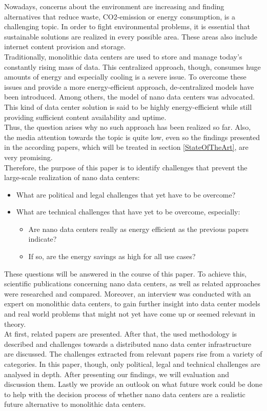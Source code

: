 Nowadays, concerns about the environment are increasing and finding alternatives that reduce waste, CO2-emission or energy consumption, is a challenging topic. In order to fight environmental problems, it is essential that sustainable solutions are realized in every possible area. These areas also include internet content provision and storage.\\ Traditionally, monolithic data centers are used to store and manage today's constantly rising mass of data. This centralized approach, though, consumes huge amounts of energy and especially cooling is a severe issue. To overcome these issues and provide a more energy-efficient approach, de-centralized models have been introduced. Among others, the model of nano data centers was advocated. This kind of data center solution is said to be highly energy-efficient while still providing sufficient content availability and uptime.\\ 
Thus, the question arises why no such approach has been realized so far. Also, the media attention towards the topic is quite low, even so the findings presented in the according papers, which will be treated in section \ref{StateOfTheArt}, are very promising. \\
Therefore, the purpose of this paper is to identify challenges that prevent the large-scale realization of nano data centers: 
\begin{itemize}
\item What are political and legal challenges that yet have to be overcome?
\item What are technical challenges that have yet to be overcome, especially:
\begin{itemize} 
\item Are nano data centers really as energy efficient as the previous papers indicate? 
\item If so, are the energy savings as high for all use cases? 
\end{itemize}
\end{itemize}
These questions will be answered in the course of this paper. To achieve this, scientific publications concerning nano data centers, as well as related approaches were researched and compared. Moreover, an interview was conducted with an expert on monolithic data centers, to gain further insight into data center models and real world problems that might not yet have come up or seemed relevant in theory.\\
At first, related papers are presented. After that, the used methodology is described and challenges towards a distributed nano data center infrastructure are discussed. The challenges extracted from relevant papers rise from a variety of categories. In this paper, though, only political, legal and technical challenges are analysed in depth. After presenting our findings, we will evaluation and discussion them. Lastly we provide an outlook on what future work could be done to help with the decision process of whether nano data centers are a realistic future alternative to monolithic data centers.
